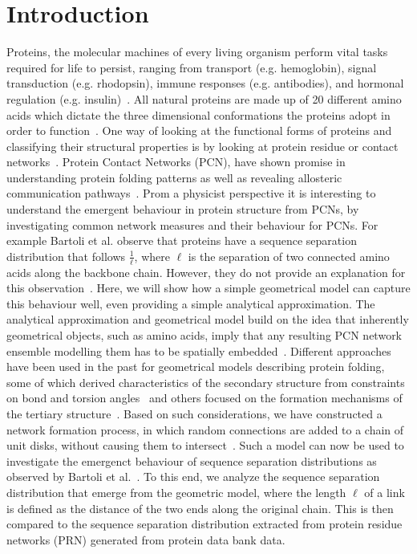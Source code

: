\documentclass[reprint,amsmath,amssymb,rmp,onecolumn,notitlepage,11pt]{revtex4-1}
\begin{document}
\section*{Introduction}
Proteins, the molecular machines of every living organism perform vital tasks required for life to persist, ranging from transport (e.g. hemoglobin), signal transduction (e.g. rhodopsin), immune responses (e.g. antibodies), and hormonal regulation (e.g. insulin)~\cite{}. All natural proteins are made up of 20 different amino acids which dictate the three dimensional conformations the proteins adopt in order to function~\cite{}. One way of looking at the functional forms of proteins and classifying their structural properties is by looking at protein residue or contact networks~\cite{Vendruscolo2002,DiPaola2013,Estrada2011}. Protein Contact Networks (PCN), have shown promise in understanding protein folding patterns as well as revealing allosteric communication pathways~\cite{https://pubs.acs.org/doi/10.1021/acs.jcim.9b00320, and others}. 
Prom a physicist perspective it is interesting to understand the emergent behaviour in protein structure from PCNs, by investigating common network measures and their behaviour for PCNs. For example Bartoli et al. observe that proteins have a sequence separation distribution that follows $\frac{1}{\ell}$, where $\ell$ is the separation of two connected amino acids along the backbone chain. However, they do not provide an explanation for this observation~\cite{bartoli2008effect}. 
Here, we will show how a simple geometrical model can capture this behaviour well, even providing a simple analytical approximation. The analytical approximation and geometrical model build on the idea that inherently geometrical objects, such as amino acids, imply that any resulting PCN network ensemble modelling them has to be spatially embedded~\cite{}. 
Different approaches have been used in the past for geometrical models describing protein folding, some of which derived characteristics of the secondary structure from constraints on bond and torsion angles~\cite{Danielsson2010,Molkenthin2011} and others focused on the formation mechanisms of the tertiary structure~\cite{molkenthin2016scaling, molkenthin2020self}. Based on such considerations, we have constructed a network formation process, in which random connections are added to a chain of unit disks, without causing them to intersect~\cite{molkenthin2016scaling}. Such a model can now be used to investigate the emergenct behaviour of sequence separation distributions as observed by Bartoli et al.~\cite{bartoli2008effect}. To this end, we analyze the sequence separation distribution that emerge from the geometric model, where the length $\ell$ of a link is defined as the distance of the two ends along the original chain.
This is then compared to the sequence separation distribution extracted from protein residue networks (PRN) generated from protein data bank data. 
\end{document}
